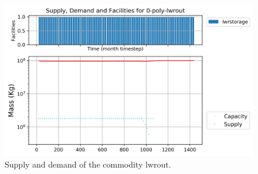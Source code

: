 \documentclass[11pt]{article}
\begin{document}
\begin{figure}[!h]
	\centering
	\includegraphics[width=\textwidth]{29-figures/0-poly-lwrout.png} 
	\hfill
	\caption{Supply and demand of the commodity lwrout.}
	\label{fig:29-out1}
\end{figure}
\end{document}
